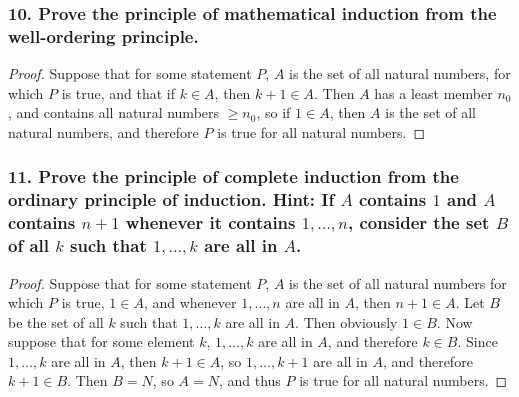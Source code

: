 \documentclass{article}
\begin{document}
\subsubsection*{10. Prove the principle of mathematical induction from the well-ordering principle.}
\begin{proof}
	Suppose that for some statement $P$, $A$ is the set of all natural numbers, for which $P$ is true, and that if $k \in A$, then $k + 1 \in A$. Then $A$ has a least member $n_0$, and contains all natural numbers $\ge n_0$, so if $1 \in A$, then $A$ is the set of all natural numbers, and therefore $P$ is true for all natural numbers.
\end{proof}

\subsubsection*{11. Prove the principle of complete induction from the ordinary principle of induction. Hint: If $A$ contains $1$ and $A$ contains $n + 1$ whenever it contains $1, \dots, n$, consider the set $B$ of all $k$ such that $1, \dots, k$ are all in $A$.}
\begin{proof}
	Suppose that for some statement $P$, $A$ is the set of all natural numbers for which $P$ is true, $1 \in A$, and whenever $1, \dots, n$ are all in $A$, then $n + 1 \in A$. Let $B$ be the set of all $k$ such that $1, \dots, k$ are all in $A$. Then obviously $1 \in B$. Now suppose that for some element $k$, $1, \dots, k$ are all in $A$, and therefore $k \in B$. Since $1, \dots, k$ are all in $A$, then $k + 1\in A$, so $1, \dots, k+1$ are all in $A$, and therefore $k + 1 \in B$. Then $B = N$, so $A = N$, and thus $P$ is true for all natural numbers.
\end{proof}
\end{document}
